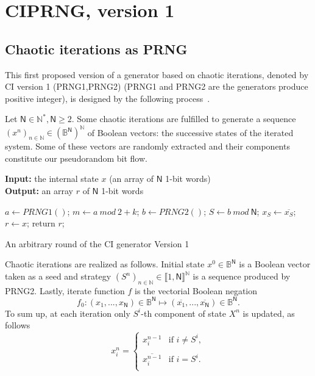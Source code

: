 \section{CIPRNG, version 1~\cite{wang2009}}
\label{Version 1 CI algorithms and examples}
\subsection{Chaotic iterations as PRNG}
\label{subsec Chaotic iterations as PRNG}
This first proposed version of a generator based on chaotic iterations, 
denoted by CI version 1 (PRNG1,PRNG2) (PRNG1 and PRNG2 are the generators produce positive integer), is designed by the following process~\cite{wang2009}. 

Let $\mathsf{N} \in \mathds{N}^*, \mathsf{N} \geqslant 2$. Some chaotic iterations are fulfilled to generate a sequence $\left(x^n\right)_{n\in\mathds{N}} \in \left(\mathds{B}^\mathsf{N}\right)^\mathds{N}$ of Boolean vectors: the successive states of the iterated system. Some of these vectors are randomly extracted and their components constitute our pseudorandom bit flow.
\begin{algorithm}
\textbf{Input:} the internal state $x$ (an array of $\mathsf{N}$ 1-bit words)\\
\textbf{Output:} an array $r$ of $\mathsf{N}$ 1-bit words
\begin{algorithmic}[1]

\STATE$a\leftarrow{PRNG1()}$;
\STATE$m\leftarrow{a~mod~2+k}$;
\STATE$b\leftarrow{PRNG2()}$;
\STATE$S\leftarrow{b~mod~\mathsf{N}}$;
\STATE$x_S\leftarrow{ \overline{x_S}}$;
\ENDWHILE
\STATE$r\leftarrow{x}$;
\STATE return $r$;
\medskip
\caption{An arbitrary round of the CI generator Version 1}
\label{Chaotic iteration}
\end{algorithmic}
\end{algorithm}

Chaotic iterations are realized as follows. Initial state $x^0 \in \mathds{B}^\mathsf{N}$ is a Boolean vector taken as a seed and strategy $\left(S^n\right)_{n\in\mathds{N}}\in \llbracket 1, \mathsf{N} \rrbracket^\mathds{N}$ is a sequence produced by PRNG2. Lastly, iterate function $f$ is the vectorial Boolean negation
$$f_0:(x_1,...,x_\mathsf{N}) \in \mathds{B}^\mathsf{N} \longmapsto (\overline{x_1},...,\overline{x_\mathsf{N}}) \in \mathds{B}^\mathsf{N}.$$
To sum up, at each iteration only $S^i$-th component of state $X^n$ is updated, as follows
\begin{equation}
x_i^n = \left\{\begin{array}{ll}x_i^{n-1} & \text{if } i \neq S^i, \\ \\ \overline{x_i^{n-1}} & \text{if } i = S^i. \\\end{array}\right.
\end{equation}

